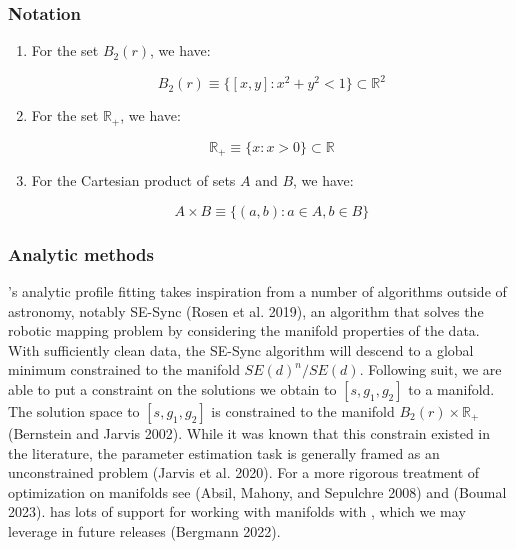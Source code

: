 \documentclass[10pt,a4paper,onecolumn]{article}
\let\textttOrig=\texttt
\def\texttt#1{\expandafter\textttOrig{\seqsplit{#1}}}
\begin{document}
\hypertarget{notation}{%
\subsubsection{Notation}\label{notation}}

\begin{enumerate}
\def\labelenumi{\arabic{enumi}.}
\item
  For the set \(B_2(r)\), we have:

  \[
  B_2(r) \equiv \{ [x,y] : x^2 + y^2 < 1 \} \subset \mathbb{R}^2
  \]
\item
  For the set \(\mathbb{R}_+\), we have:

  \[
  \mathbb{R}_+ \equiv \{ x : x > 0 \} \subset \mathbb{R}
  \]
\item
  For the Cartesian product of sets \(A\) and \(B\), we have:

  \[
  A \times B \equiv \{(a, b): a \in A, b \in B \}
  \]
\end{enumerate}

\hypertarget{analytic-methods}{%
\subsubsection{Analytic methods}\label{analytic-methods}}

\texttt{ShOpt.jl}'s analytic profile fitting takes inspiration from a
number of algorithms outside of astronomy, notably SE-Sync (Rosen et al.
2019), an algorithm that solves the robotic mapping problem by
considering the manifold properties of the data. With sufficiently clean
data, the SE-Sync algorithm will descend to a global minimum constrained
to the manifold \(SE(d)^n / SE(d)\). Following suit, we are able to put
a constraint on the solutions we obtain to \([s, g_1, g_2]\) to a
manifold. The solution space to \([s, g_1, g_2]\) is constrained to the
manifold \(B_2(r) \times \mathbb{R}_{+}\) (Bernstein and Jarvis 2002).
While it was known that this constrain existed in the literature, the
parameter estimation task is generally framed as an unconstrained
problem (Jarvis et al. 2020). For a more rigorous treatment of
optimization on manifolds see (Absil, Mahony, and Sepulchre 2008) and
(Boumal 2023). \texttt{Julia} has lots of support for working with
manifolds with \texttt{Manopt}, which we may leverage in future releases
(Bergmann 2022).
\end{document}

